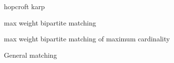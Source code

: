 
\begin{algorithm}{hopcroft karp}
\end{algorithm}


\begin{algorithm}{max weight bipartite matching}
\end{algorithm}


\begin{algorithm}{max weight bipartite matching of maximum cardinality}
\end{algorithm}


\begin{algorithm}{General matching}
\end{algorithm}
